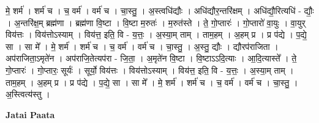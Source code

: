 \documentclass[17pt]{extarticle}
\begin{document}
मे॒ शर्म॑ । शर्म॑ च । च॒ वर्म॑ । वर्म॑ च । चा॒स्तु॒ । अ॒स्त्वधि॑द्यौः । अधि॑द्यौर॒न्तरि॑क्षम् । अधि॑द्यौ॒रित्यधि॑ - द्यौः॒ । अ॒न्तरि॑क्ष॒म् ब्रह्म॑णा । ब्रह्म॑णा वि॒ष्टा । वि॒ष्टा म॒रुतः॑ । म॒रुत॑स्ते । ते॒ गो॒प्तारः॑ । गो॒प्तारो॑ वा॒युः । वा॒युर् विय॑त्तः । विय॑त्तोऽस्याम् । विय॑त्त॒ इति॒ वि - य॒त्तः॒ । अ॒स्या॒म् ताम् । ताम॒हम् । अ॒हम् प्र । 
प्र प॑द्ये । प॒द्ये॒ सा । सा मे᳚ । मे॒ शर्म॑ । शर्म॑ च । च॒ वर्म॑ । वर्म॑ च । चा॒स्तु॒ । अ॒स्तु॒ द्यौः । द्यौरप॑राजिता । अप॑राजिता॒ऽमृते॑न । अप॑राजि॒तेत्यप॑रा - जि॒ता॒ । अ॒मृते॑न वि॒ष्टा । वि॒ष्टाऽऽदि॒त्याः । आ॒दि॒त्यास्ते᳚ । ते॒ गो॒प्तारः॑ । गो॒प्तारः॒ सूर्यः॑ । सूर्यो॒ विय॑त्तः । विय॑त्तोऽस्याम् । विय॑त्त॒ इति॒ वि - य॒त्तः॒ । अ॒स्या॒म् ताम् । ताम॒हम् । अ॒हम् प्र । प्र प॑द्ये । प॒द्ये॒ सा । सा मे᳚ । मे॒ शर्म॑ । शर्म॑ च । च॒ वर्म॑ । वर्म॑ च । चा॒स्तु॒ । अ॒स्त्वित्य॑स्तु । \newline

\textbf{Jatai Paata} \newline
\end{document}
